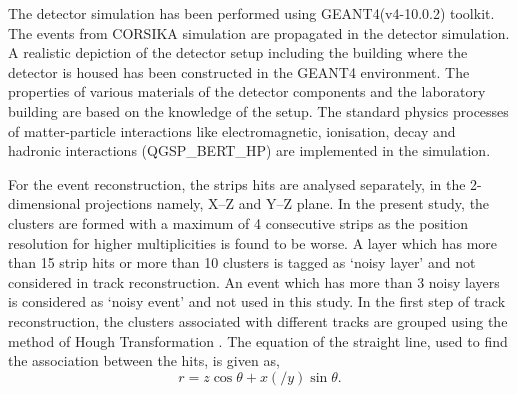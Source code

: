 \documentclass[a4paper,12pt,twoside,openany]{article}
\begin{document}
The detector simulation has been performed using GEANT4(v4-10.0.2)
toolkit. The events from CORSIKA simulation are propagated in the
detector simulation. A realistic depiction of the detector setup
including the building where the detector is housed has been
constructed in the GEANT4 environment. The properties of various
materials of the detector components and the laboratory building are
based on the knowledge of the setup. The standard physics processes of
matter-particle interactions like electromagnetic, ionisation, decay
and hadronic interactions (QGSP\_BERT\_HP) are implemented in the
simulation.

For the event reconstruction, the strips hits are analysed separately,
in the 2-dimensional projections namely, \mbox{X--Z} and \mbox{Y--Z}
plane. In the present study, the clusters are formed with a maximum of
4 consecutive strips as the position resolution for higher
multiplicities is found to be worse. A layer which has more than 15
strip hits or more than 10 clusters is tagged as `noisy layer' and not
considered in track reconstruction. An event which has more than 3
noisy layers is considered as `noisy event' and not used in this
study. In the first step of track reconstruction, the clusters
associated with different tracks are grouped using the method of Hough
Transformation \cite{hought}. The equation of the straight line, used
to find the association between the hits, is given as,
\begin{equation}
  r=z\cos\theta+x\left(/y\right)\sin\theta. \label{eq:hough}
\end{equation}
\end{document}
